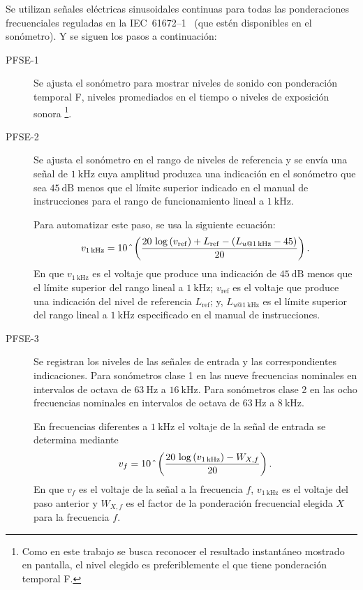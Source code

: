 Se utilizan señales eléctricas sinusoidales continuas para todas las ponderaciones frecuenciales reguladas en la \mbox{IEC 61672--1}~\citeyearpar{IEC_TC29_2013_1} (que estén disponibles en el sonómetro).
Y se siguen los pasos a continuación:
%
\begin{description}
    \item[PFSE-1] Se ajusta el sonómetro para mostrar niveles de sonido con ponderación temporal F, niveles promediados en el tiempo o niveles de exposición sonora \footnote{Como en este trabajo se busca reconocer el resultado instantáneo mostrado en pantalla, el nivel elegido es preferiblemente el que tiene ponderación temporal F.}.

    \item[PFSE-2] Se ajusta el sonómetro en el rango de niveles de referencia y se envía una señal de $\qty{1}{\kHz}$ cuya amplitud produzca una indicación en el sonómetro que sea $\qty{45}{\dB}$ menos que el límite superior indicado en el manual de instrucciones para el rango de funcionamiento lineal a $\qty{1}{\kHz}$.

    Para automatizar este paso, se usa la siguiente ecuación:
%
    \begin{equation}
        \label{eq:voltage_1khz}
        v_{\qty{1}{\kHz}} = 10\,\hat{\mkern6mu}
        \left(\frac{20\,\log\left(v_{\mathrm{ref}}\right) + L_{\mathrm{ref}} - \left(L_{u@\qty{1}{\kHz}} - 45\right)}{20}\right).
    \end{equation}
%
    En que $v_{\qty{1}{\kHz}}$ es el voltaje que produce una indicación de $\qty{45}{\dB}$ menos que el límite superior del rango lineal a $\qty{1}{\kHz}$; $v_{\mathrm{ref}}$ es el voltaje que produce una indicación del nivel de referencia $L_{\mathrm{ref}}$; y, $L_{u@\qty{1}{\kHz}}$ es el límite superior del rango lineal a $\qty{1}{\kHz}$ especificado en el manual de instrucciones.

    \item[PFSE-3] Se registran los niveles de las señales de entrada y las correspondientes indicaciones.
    Para sonómetros clase 1 en las nueve frecuencias nominales en intervalos de octava de $\qty{63}{\Hz}$ a $\qty{16}{\kHz}$.
    Para sonómetros clase 2 en las ocho frecuencias nominales en intervalos de octava de $\qty{63}{\Hz}$ a $\qty{8}{\kHz}$.

    En frecuencias diferentes a $\qty{1}{\kHz}$ el voltaje de la señal de entrada se determina mediante
%
    \begin{equation}
        \label{eq:voltage_by_frequency}
        v_f = 10\,\hat{\mkern6mu}\left(\frac{20\,\log\left(v_{\qty{1}{\kHz}}\right) - W_{X,f}}{20}\right).
    \end{equation}
%
    En que $v_f$ es el voltaje de la señal a la frecuencia $f$, $v_{\qty{1}{\kHz}}$ es el voltaje del paso anterior y $W_{X,f}$ es el factor de la ponderación frecuencial elegida $X$ para la frecuencia $f$.


\end{description}

